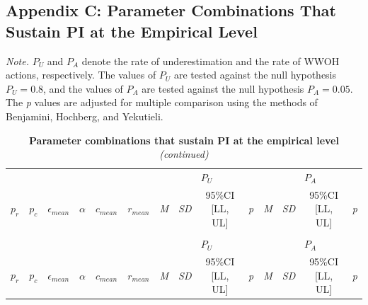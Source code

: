 \documentclass[
  11pt,
]{article}
\begin{document}
\begin{landscape}

\hypertarget{appendix-c-parameter-combinations-that-sustain-pi-at-the-empirical-level}{%
\subsection{Appendix C: Parameter Combinations That Sustain PI at the
Empirical
Level}\label{appendix-c-parameter-combinations-that-sustain-pi-at-the-empirical-level}}

\renewcommand{\thetable}{C1}

\begin{ThreePartTable}
\begin{TableNotes}
\small
\item \textit{Note.} $P_U$ and $P_A$ denote the rate of underestimation and the rate of WWOH actions, respectively. The values of $P_U$ are tested against the null hypothesis $P_U = 0.8$, and the values of $P_A$ are tested against the null hypothesis $P_A = 0.05$. The \textit{p} values are adjusted for multiple comparison using the methods of Benjamini, Hochberg, and Yekutieli.
\end{TableNotes}
\begin{longtable}[t]{cccccccccccccc}
\caption{\textbf{Parameter combinations that sustain PI at the empirical level}}\\
\toprule
\multicolumn{6}{c}{ } & \multicolumn{4}{c}{$P_U$} & \multicolumn{4}{c}{$P_A$} \\
\cmidrule(l{3pt}r{3pt}){7-10} \cmidrule(l{3pt}r{3pt}){11-14}
\multicolumn{1}{c}{$p_r$} & \multicolumn{1}{c}{$p_c$} & \multicolumn{1}{c}{$\epsilon_{mean}$} & \multicolumn{1}{c}{$\alpha$} & \multicolumn{1}{c}{$c_{mean}$} & \multicolumn{1}{c}{$r_{mean}$} & \multicolumn{1}{c}{\em{M}} & \multicolumn{1}{c}{\em{SD}} & \multicolumn{1}{c}{95\%CI [LL, UL]} & \multicolumn{1}{c}{\em{p}} & \multicolumn{1}{c}{\em{M}} & \multicolumn{1}{c}{\em{SD}} & \multicolumn{1}{c}{95\%CI [LL, UL]} & \multicolumn{1}{c}{\em{p}}\\
\midrule
\endfirsthead
\caption[]{\textbf{Parameter combinations that sustain PI at the empirical level} \textit{(continued)}}\\
\toprule
\multicolumn{6}{c}{ } & \multicolumn{4}{c}{$P_U$} & \multicolumn{4}{c}{$P_A$} \\
\cmidrule(l{3pt}r{3pt}){7-10} \cmidrule(l{3pt}r{3pt}){11-14}
\multicolumn{1}{c}{$p_r$} & \multicolumn{1}{c}{$p_c$} & \multicolumn{1}{c}{$\epsilon_{mean}$} & \multicolumn{1}{c}{$\alpha$} & \multicolumn{1}{c}{$c_{mean}$} & \multicolumn{1}{c}{$r_{mean}$} & \multicolumn{1}{c}{\em{M}} & \multicolumn{1}{c}{\em{SD}} & \multicolumn{1}{c}{95\%CI [LL, UL]} & \multicolumn{1}{c}{\em{p}} & \multicolumn{1}{c}{\em{M}} & \multicolumn{1}{c}{\em{SD}} & \multicolumn{1}{c}{95\%CI [LL, UL]} & \multicolumn{1}{c}{\em{p}}\\
\midrule
\endhead


\end{longtable}
\end{ThreePartTable}
\end{landscape}
\end{document}
